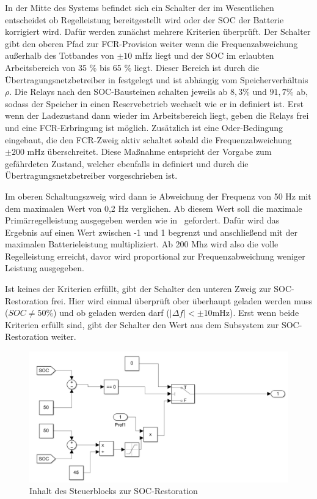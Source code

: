 In der Mitte des Systems befindet sich ein Schalter der im Wesentlichen entscheidet ob Regelleistung bereitgestellt wird
oder der SOC der Batterie korrigiert wird.
Dafür werden zunächst mehrere Kriterien überprüft.
Der Schalter gibt den oberen Pfad zur FCR-Provision weiter wenn die Frequenzabweichung außerhalb des Totbandes von $\pm 10$ mHz liegt
und der SOC im erlaubten Arbeitsbereich von 35 \% bis 65 \% liegt.
Dieser Bereich ist durch die Übertragungsnetzbetreiber in \parencite[]{Reservebetrieb} festgelegt und ist abhängig vom Speicherverhältnis $\rho$.
Die Relays nach den SOC-Bausteinen schalten jeweils ab $8,3 \%$ und $91,7 \%$ ab, sodass der Speicher in einen Reservebetrieb wechselt wie er in \parencite[]{Reservebetrieb}
definiert ist.
Erst wenn der Ladezustand dann wieder im Arbeitsbereich liegt, geben die Relays frei und eine FCR-Erbringung ist möglich.
Zusätzlich ist eine Oder-Bedingung eingebaut, die den FCR-Zweig aktiv schaltet sobald die Frequenzabweichung $\pm 200$ mHz überschreitet.
Diese Maßnahme entspricht der Vorgabe zum gefährdeten Zustand, welcher ebenfalls in \parencite[]{Reservebetrieb} definiert 
und durch die Übertragungsnetzbetreiber vorgeschrieben ist.

Im oberen Schaltungszweig wird dann ie Abweichung der Frequenz von 50 Hz mit dem maximalen Wert von 0,2 Hz verglichen.
Ab diesem Wert soll die maximale Primärregelleistung ausgegeben werden wie in~\parencite[Kap. 3.1]{Regelleistung} gefordert.
Dafür wird das Ergebnis auf einen Wert zwischen -1 und 1 begrenzt und anschließend 
mit der maximalen Batterieleistung multipliziert.
Ab 200 Mhz wird also die volle Regelleistung erreicht, davor wird proportional zur Frequenzabweichung
weniger Leistung ausgegeben.

Ist keines der Kriterien erfüllt, gibt der Schalter den unteren Zweig zur SOC-Restoration frei.
Hier wird einmal überprüft ober überhaupt geladen werden muss ($SOC \neq 50 \%$) und ob geladen werden darf ($|\Delta f| < \pm 10 \text{mHz}$).
Erst wenn beide Kriterien erfüllt sind, gibt der Schalter den Wert aus dem Subsystem zur SOC-Restoration weiter.

\begin{figure}[h!]
	\centering
	\includegraphics[width=12cm]{Abbildungen/SOC-Rest.png}
	\caption{Inhalt des Steuerblocks zur SOC-Restoration}\label{SOC-Rest}
\end{figure}

